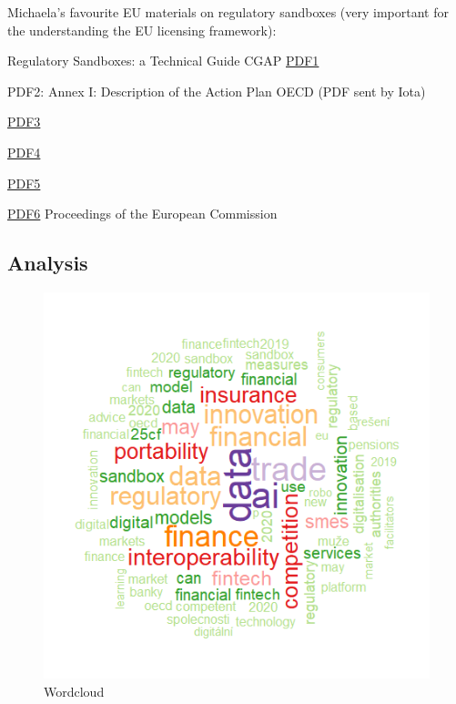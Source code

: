 \documentclass[
]{book}
\begin{document}
Michaela's favourite EU materials on regulatory sandboxes (very important for the understanding the EU licensing framework):

Regulatory Sandboxes: a Technical Guide CGAP
\href{https://www.cgap.org/research/publication/how-build-regulatory-sandbox-practical-guide-policy-makers}{PDF1}

PDF2: Annex I: Description of the Action Plan OECD (PDF sent by Iota)

\href{https://www.esma.europa.eu/sites/default/files/library/esma50-164-2430_licensing_of_fintech.pdf}{PDF3}

\href{https://www.europarl.europa.eu/RegData/etudes/STUD/2020/652752/IPOL_STU(2020)652752_EN.pdf}{PDF4}

\href{https://esas-joint-committee.europa.eu/Publications/Reports/JC\%202018\%2074\%20Joint\%20Report\%20on\%20Regulatory\%20Sandboxes\%20and\%20Innovation\%20Hubs.pdf}{PDF5}

\href{https://data.consilium.europa.eu/doc/document/ST-13026-2020-INIT/en/pdf}{PDF6}
Proceedings of the European Commission

\hypertarget{analysis}{%
\subsection{Analysis}\label{analysis}}

\begin{figure}

{\centering \includegraphics[width=0.8\linewidth]{img/nube} 

}

\caption{Wordcloud}\label{fig:nice-figN1}
\end{figure}
\end{document}
